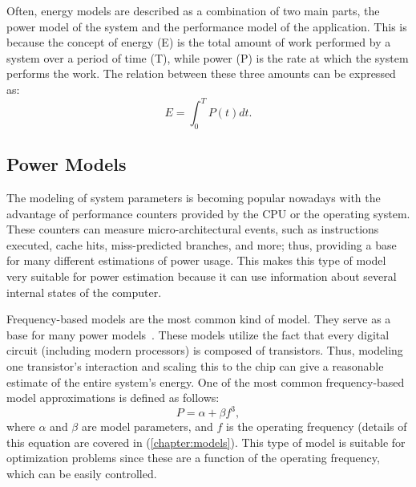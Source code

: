 Often, energy models are described as a combination of two main parts, the power model of the system and the performance model of the application. This is because the concept of energy (E) is the total amount of work performed by a system over a period of time (T), while power (P) is the rate at which the system performs the work. The relation between these three amounts can be expressed as:
\begin{equation}
E = \int_{0}^{T}P(t)dt.
\label{eq:energy_definition_cont}
\end{equation}

\subsection{Power Models}

The modeling of system parameters is becoming popular nowadays with the advantage of performance counters provided by the CPU or the operating system. These counters can measure micro-architectural events, such as instructions executed, cache hits, miss-predicted branches, and more; thus, providing a base for many different estimations of power usage. This makes this type of model very suitable for power estimation because it can use information about several internal states of the computer.

Frequency-based models are the most common kind of model. They serve as a base for many power models~\cite{Sarwar1997CmosCalculation, Butzen2007LeakageGates, Usman2013ANoC}. These models utilize the fact that every digital circuit (including modern processors) is composed of transistors. Thus, modeling one transistor's interaction and scaling this to the chip can give a reasonable estimate of the entire system's energy. One of the most common frequency-based %
model approximations is defined as follows: 
\begin{equation}
P = \alpha+\beta f^3,
\label{eq:power_simplified}
\end{equation}
where $\alpha$ and $\beta$ are model parameters, and $f$ is the operating frequency (details of this equation are covered in (\cref{chapter:models}). This type of model is suitable for optimization problems since these are a function of the operating frequency, which can be easily controlled.


